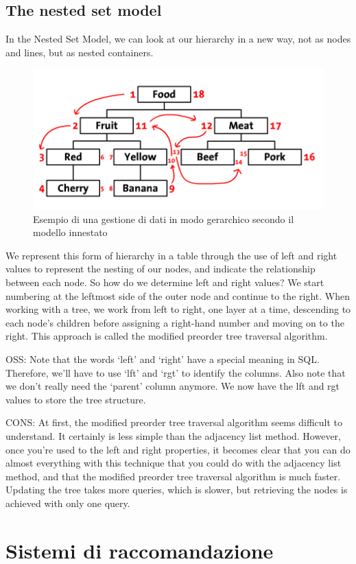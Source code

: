 \subsection{The nested set model}
In the Nested Set Model, we can look at our hierarchy in a new way, not as nodes and lines, but as nested containers. 

\begin{figure}[ht!]
    \centering
	\includegraphics[scale=1]{images/Nested_Tree_Model_ex.PNG}
	\caption{Esempio di una gestione di dati in modo gerarchico secondo il modello innestato}
\end{figure}


We represent this form of hierarchy in a table through the use of left and right values to represent the nesting of our nodes, 
and indicate the relationship between each node.
So how do we determine left and right values? 
We start numbering at the leftmost side of the outer node and continue to the right. When working with a tree, we work from left to 
right, one layer at a time, descending to each node’s children before assigning a right-hand number and moving on to the right. 
This approach is called the modified preorder tree traversal algorithm.



OSS: Note that the words ‘left’ and ‘right’ have a special meaning in SQL. Therefore, we’ll have to use ‘lft’ and ‘rgt’ to identify 
the columns. Also note that we don’t really need the ‘parent’ column anymore. We now have the lft and rgt values to store the tree 
structure.

CONS: At first, the modified preorder tree traversal algorithm seems difficult to understand. It certainly is less simple than the 
adjacency list method. However, once you’re used to the left and right properties, it becomes clear that you can do almost everything 
with this technique that you could do with the adjacency list method, and that the modified preorder tree traversal algorithm is much 
faster. Updating the tree takes more queries, which is slower, but retrieving the nodes is achieved with only one query.


\section{Sistemi di raccomandazione}